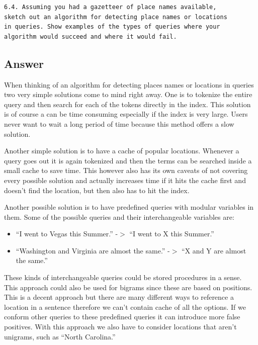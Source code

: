 \documentclass[letterpaper,11pt]{article}
\begin{document}
\begin{verbatim}
6.4. Assuming you had a gazetteer of place names available, 
sketch out an algorithm for detecting place names or locations
in queries. Show examples of the types of queries where your 
algorithm would succeed and where it would fail.
\end{verbatim}

\subsection*{Answer}

When thinking of an algorithm for detecting places names or locations in queries two very simple solutions come to mind right away.
One is to tokenize the entire query and then search for each of the tokens directly in the index.
This solution is of course a can be time consuming especially if the index is very large.
Users never want to wait a long period of time because this method offers a slow solution.

Another simple solution is to have a cache of popular locations.
Whenever a query goes out it is again tokenized and then the terms can be searched inside a small cache to save time.
This however also has its own caveats of not covering every possible solution and actually increases time if it hits the cache first and doesn't find the location, but then also has to hit the index.

Another possible solution is to have predefined queries with modular variables in them.
Some of the possible queries and their interchangeable variables are:

\begin{itemize}
  \item ``I went to Vegas this Summer.'' -$>$ ``I went to X this Summer.''
  \item ``Washington and Virginia are almost the same.'' -$>$ ``X and Y are almost the same.''
\end{itemize}

These kinds of interchangeable queries could be stored procedures in a sense.
This approach could also be used for bigrams since these are based on positions.
This is a decent approach but there are many different ways to reference a location in a sentence therefore we can't contain cache of all the options.
If we conform other queries to these predefined queries it can introduce more false positives.
With this approach we also have to consider locations that aren't unigrams, such as ``North Carolina.''
\end{document}
